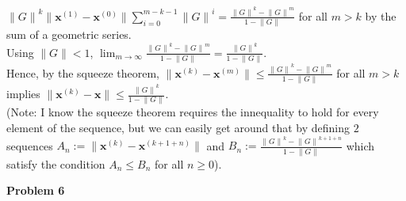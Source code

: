 \documentclass[10pt]{article}
\begin{document}
\begin{enumerate}[label=(\alph*)]
\begin{enumerate}[label=(\roman*)]
      $\displaystyle{\lVert G\rVert}^{k}\lVert\mathbf{x}^{(1)}-\mathbf{x}^{(0)}\rVert\sum_{i=0}^{m-k-1}{\lVert G\rVert}^{i}=\frac{{\lVert G\rVert}^{k}-{\lVert G\rVert}^{m}}{1-\lVert G\rVert}$ for all $m>k$ by the sum of a geometric series.\\
      Using $\lVert G\rVert<1$, $\displaystyle\lim_{m\rightarrow\infty}\frac{{\lVert G\rVert}^{k}-{\lVert G\rVert}^{m}}{1-\lVert G\rVert}=\frac{{\lVert G\rVert}^{k}}{1-\lVert G\rVert}$.\\
      Hence, by the squeeze theorem, $\lVert\mathbf{x}^{(k)}-\mathbf{x}^{(m)}\rVert\le \frac{{\lVert G\rVert}^{k}-{\lVert G\rVert}^{m}}{1-\lVert G\rVert}$ for all $m>k$ implies $\lVert\mathbf{x}^{(k)}-\mathbf{x}\rVert\le\frac{{\lVert G\rVert}^{k}}{1-\lVert G\rVert}$.\\
      (Note: I know the squeeze theorem requires the innequality to hold for every element of the sequence, but we can easily get around that by defining $2$ sequences $A_n:=\lVert\mathbf{x}^{(k)}-\mathbf{x}^{(k+1+n)}\rVert$ and $B_n:=\frac{{\lVert G\rVert}^{k}-{\lVert G\rVert}^{k+1+n}}{1-\lVert G\rVert}$ which satisfy the condition $A_n\le B_n$ for all $n\ge0$).
   \end{enumerate}
\end{enumerate}
\textbf{Problem 6}\\
\end{document}
